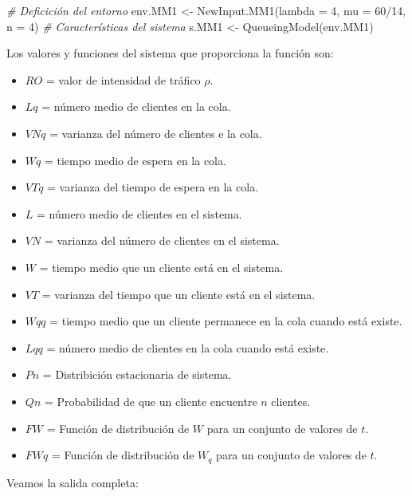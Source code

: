 \documentclass[
]{book}
\newenvironment{Shaded}{\begin{snugshade}}{\end{snugshade}}
\newcommand{\AttributeTok}[1]{\textcolor[rgb]{0.77,0.63,0.00}{#1}}
\newcommand{\CommentTok}[1]{\textcolor[rgb]{0.56,0.35,0.01}{\textit{#1}}}
\newcommand{\DecValTok}[1]{\textcolor[rgb]{0.00,0.00,0.81}{#1}}
\newcommand{\FunctionTok}[1]{\textcolor[rgb]{0.00,0.00,0.00}{#1}}
\newcommand{\NormalTok}[1]{#1}
\newcommand{\OtherTok}[1]{\textcolor[rgb]{0.56,0.35,0.01}{#1}}
\newcommand{\SpecialCharTok}[1]{\textcolor[rgb]{0.00,0.00,0.00}{#1}}
\providecommand{\tightlist}{%
  \setlength{\itemsep}{0pt}\setlength{\parskip}{0pt}}
\theoremstyle{definition}
\theoremstyle{definition}
\theoremstyle{definition}
\theoremstyle{definition}
\theoremstyle{remark}
\begin{document}
\begin{Shaded}
\begin{Highlighting}[]
\CommentTok{\# Deficición del entorno}
\NormalTok{env.MM1 }\OtherTok{\textless{}{-}} \FunctionTok{NewInput.MM1}\NormalTok{(}\AttributeTok{lambda =} \DecValTok{4}\NormalTok{, }\AttributeTok{mu =} \DecValTok{60}\SpecialCharTok{/}\DecValTok{14}\NormalTok{, }\AttributeTok{n =} \DecValTok{4}\NormalTok{)}
\CommentTok{\# Características del sistema}
\NormalTok{s.MM1 }\OtherTok{\textless{}{-}} \FunctionTok{QueueingModel}\NormalTok{(env.MM1)}
\end{Highlighting}
\end{Shaded}

Los valores y funciones del sistema que proporciona la función son:

\begin{itemize}
\tightlist
\item
  \(RO\) = valor de intensidad de tráfico \(\rho\).
\item
  \(Lq\) = número medio de clientes en la cola.
\item
  \(VNq\) = varianza del número de clientes e la cola.
\item
  \(Wq\) = tiempo medio de espera en la cola.
\item
  \(VTq\) = varianza del tiempo de espera en la cola.
\item
  \(L\) = número medio de clientes en el sistema.
\item
  \(VN\) = varianza del número de clientes en el sistema.
\item
  \(W\) = tiempo medio que un cliente está en el sistema.
\item
  \(VT\) = varianza del tiempo que un cliente está en el sistema.
\item
  \(Wqq\) = tiempo medio que un cliente permanece en la cola cuando está existe.
\item
  \(Lqq\) = número medio de clientes en la cola cuando está existe.
\item
  \(Pn\) = Distribición estacionaria de sistema.
\item
  \(Qn\) = Probabilidad de que un cliente encuentre \(n\) clientes.
\item
  \(FW\) = Función de distribución de \(W\) para un conjunto de valores de \(t\).
\item
  \(FWq\) = Función de distribución de \(W_q\) para un conjunto de valores de \(t\).
\end{itemize}

Veamos la salida completa:
\end{document}
